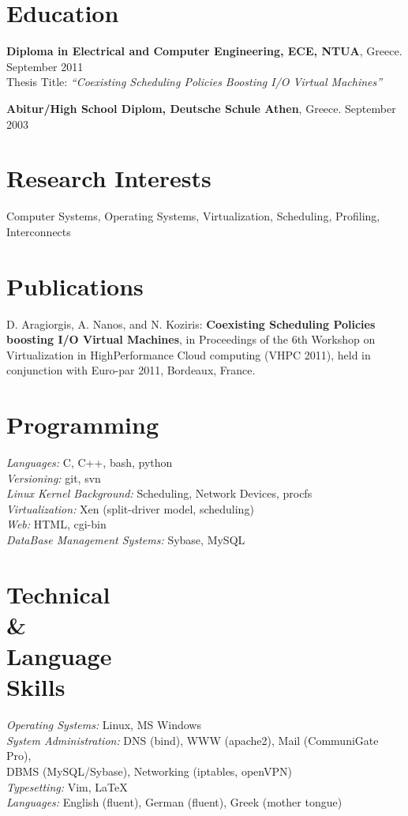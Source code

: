 \documentclass[margin,centered]{res}
\newenvironment{list1}{
  \begin{list}{\ding{71}}{%
      \setlength{\itemsep}{0in}
      \setlength{\parsep}{0in} \setlength{\parskip}{0in}
      \setlength{\topsep}{0in} \setlength{\partopsep}{0in} 
      \setlength{\leftmargin}{0.17in}}}{\end{list}}
\begin{document}
\begin{resume}

\section{\sc Education}
\begin{list1}
\item
{\bf Diploma in Electrical and Computer Engineering, ECE, NTUA}, Greece. September 2011\\
Thesis Title:  \textit{``Coexisting Scheduling Policies Boosting I/O Virtual Machines''} 
\item 
{\bf Abitur/High School Diplom, Deutsche Schule Athen}, Greece. September 2003
\end{list1}
\section{\sc Research Interests}
Computer Systems, Operating Systems, Virtualization, Scheduling, Profiling, Interconnects

\section{\sc Publications}
D. Aragiorgis, A. Nanos, and N. Koziris: \textbf{Coexisting Scheduling Policies boosting I/O Virtual Machines}, in Proceedings of the 6th Workshop on Virtualization in HighPerformance Cloud computing (VHPC 2011), held in conjunction with Euro-par 2011, Bordeaux, France.

\section{\sc Programming}
\textit{Languages:} C, C++, bash, python \\
\textit{Versioning:} git, svn\\
\textit{Linux Kernel Background:} Scheduling, Network Devices, procfs \\
\textit{Virtualization:} Xen (split-driver model, scheduling) \\
\textit{Web:} HTML, cgi-bin \\
\textit{DataBase Management Systems:} Sybase, MySQL \\

\section{\sc Technical\\\&\\Language\\Skills}
\textit{Operating Systems:} Linux, MS Windows \\
\textit{System Administration:} DNS (bind), WWW (apache2), Mail (CommuniGate Pro), \\ DBMS (MySQL/Sybase), Networking (iptables, openVPN)\\
\textit{Typesetting:} Vim, \LaTeX \\
\textit{Languages:} English (fluent), German (fluent), Greek (mother tongue)


\end{resume}
\end{document}
